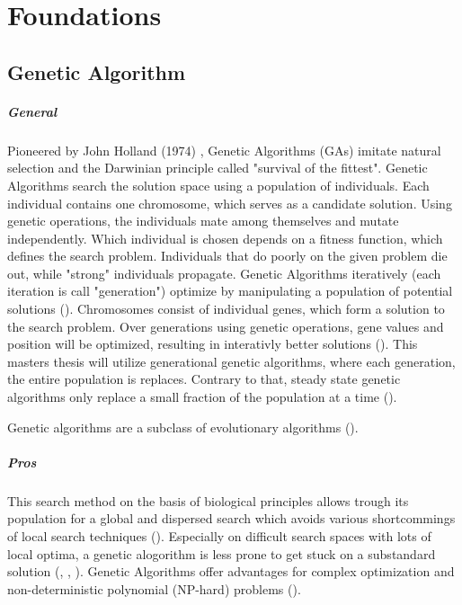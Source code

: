 \chapter{Foundations}
\label{chap:foundation}

\section{Genetic Algorithm}
\label{chap:foundation:genetic_algorithm}


\paragraph{General}
Pioneered by John Holland (1974) , Genetic Algorithms (GAs) imitate natural selection and the Darwinian principle called "survival of the fittest". Genetic Algorithms search the solution space using a population of individuals. Each individual contains one chromosome, which serves as a candidate solution. Using genetic operations, the individuals mate among themselves and mutate independently. Which individual is chosen depends on a fitness function, which defines the search problem. Individuals that do poorly on the given problem die out, while "strong" individuals propagate.
Genetic Algorithms iteratively (each iteration is call "generation") optimize by manipulating a population of potential solutions (\cite{srinivas_genetic_1994}).
Chromosomes consist of individual genes, which form a solution to the search problem. Over generations using genetic operations, gene values and position will be optimized, resulting in interativly better solutions (\cite{srinivas_genetic_1994}).
This masters thesis will utilize generational genetic algorithms, where each generation, the entire population is replaces. Contrary to that, steady state genetic algorithms only replace a small fraction of the population at a time (\cite{srinivas_genetic_1994}).

Genetic algorithms are a subclass of evolutionary algorithms (\cite{mills_determining_2015}).


\paragraph{Pros}
This search method on the basis of biological principles allows trough its population for a global and dispersed search which avoids various shortcommings of local search techniques (\cite{grefenstette_optimization_1986}). Especially on difficult search spaces with lots of local optima, a genetic alogorithm is less prone to get stuck on a substandard solution (\cite{katoch_review_2021}, \cite{xia_genetic_2019}, \cite{majumdar_genetic_2015}). Genetic Algorithms offer advantages for complex optimization and non-deterministic polynomial (NP-hard) problems (\cite{hussain_trade-off_2020}).

